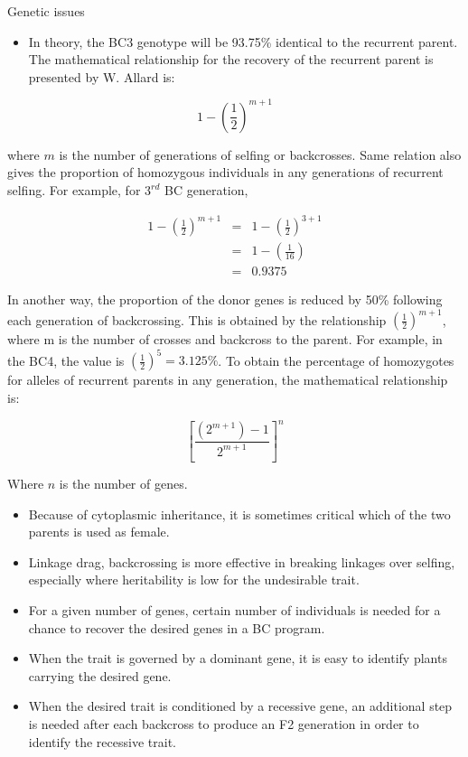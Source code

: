 \documentclass[11pt,ignorenonframetext,aspectratio=169]{beamer}
\providecommand{\tightlist}{%
  \setlength{\itemsep}{0pt}\setlength{\parskip}{0pt}}
\begin{document}
\begin{frame}{Genetic issues}
\protect\hypertarget{genetic-issues}{}
\begin{itemize}
\tightlist
\item
  In theory, the BC3 genotype will be 93.75\% identical to the recurrent
  parent. The mathematical relationship for the recovery of the
  recurrent parent is presented by W. Allard is:
\end{itemize}

\[
1-\left(\frac{1}{2}\right)^{m+1}
\]

where \(m\) is the number of generations of selfing or backcrosses. Same
relation also gives the proportion of homozygous individuals in any
generations of recurrent selfing. For example, for \(3^{rd}\) BC
generation,

\[
\begin{aligned}
1-\left(\frac{1}{2}\right)^{m+1} &=& 1-\left(\frac{1}{2}\right)^{3+1} \\
~ &=& 1-\left(\frac{1}{16}\right) \\
~ &=& 0.9375
\end{aligned}
\]
\end{frame}

\begin{frame}{}
\protect\hypertarget{section-14}{}
In another way, the proportion of the donor genes is reduced by 50\%
following each generation of backcrossing. This is obtained by the
relationship \(\left(\frac{1}{2}\right)^{m+1}\), where m is the number
of crosses and backcross to the parent. For example, in the BC4, the
value is \(\left(\frac{1}{2}\right)^{5} = 3.125\%\). To obtain the
percentage of homozygotes for alleles of recurrent parents in any
generation, the mathematical relationship is:

\[\left[\frac{\left(2^{m+1}\right)-1}{2^{m+1}}\right]^{n}\]

Where \(n\) is the number of genes.
\end{frame}

\begin{frame}{}
\protect\hypertarget{section-15}{}
\begin{itemize}
\tightlist
\item
  Because of cytoplasmic inheritance, it is sometimes critical which of
  the two parents is used as female.
\item
  Linkage drag, backcrossing is more effective in breaking linkages over
  selfing, especially where heritability is low for the undesirable
  trait.
\item
  For a given number of genes, certain number of individuals is needed
  for a chance to recover the desired genes in a BC program.
\item
  When the trait is governed by a dominant gene, it is easy to identify
  plants carrying the desired gene.
\item
  When the desired trait is conditioned by a recessive gene, an
  additional step is needed after each backcross to produce an F2
  generation in order to identify the recessive trait.
\end{itemize}
\end{frame}
\end{document}
